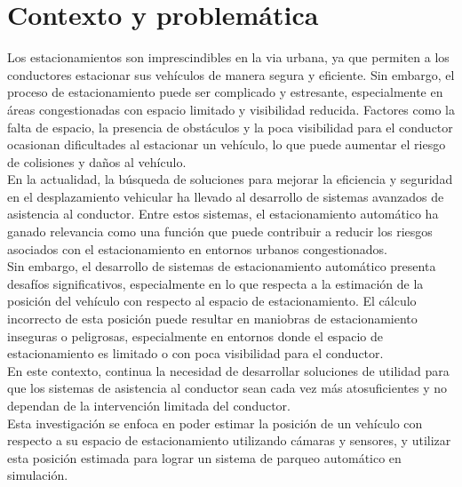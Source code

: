 \documentclass[12pt,letterpaper,final]{article}
\begin{document}
    \section*{Contexto y problemática}
    \noindent
    Los estacionamientos son imprescindibles en la via urbana, ya que permiten a los conductores estacionar sus vehículos
    de manera segura y eficiente. Sin embargo, el proceso de estacionamiento puede ser complicado y estresante,
    especialmente en áreas congestionadas con espacio limitado y visibilidad reducida.
    Factores como la falta de espacio, la presencia de obstáculos y la poca visibilidad para el conductor ocasionan
    dificultades al estacionar un vehículo, lo que puede aumentar el riesgo de colisiones y daños al vehículo.
    \\
    En la actualidad, la búsqueda de soluciones para mejorar la eficiencia y seguridad en el desplazamiento vehicular
    ha llevado al desarrollo de sistemas avanzados de asistencia al conductor.
    Entre estos sistemas, el estacionamiento automático ha ganado relevancia como una función que puede contribuir
    a reducir los riesgos asociados con el estacionamiento en entornos urbanos congestionados.
    \\
    Sin embargo, el desarrollo de sistemas de estacionamiento automático presenta desafíos significativos,
    especialmente en lo que respecta a la estimación de la posición del vehículo con respecto al espacio de estacionamiento.
    El cálculo incorrecto de esta posición puede resultar en maniobras de estacionamiento inseguras o peligrosas,
    especialmente en entornos donde el espacio de estacionamiento es limitado o con poca visibilidad para el conductor.
    \\
    En este contexto, continua la necesidad de desarrollar soluciones de utilidad para que los sistemas de asistencia al conductor
    sean cada vez más atosuficientes y no dependan de la intervención limitada del conductor.
    \\
    Esta investigación se enfoca en poder estimar la posición de un vehículo con respecto a su espacio de estacionamiento
    utilizando cámaras y sensores, y utilizar esta posición estimada para lograr un sistema de parqueo automático en simulación.
\end{document}
